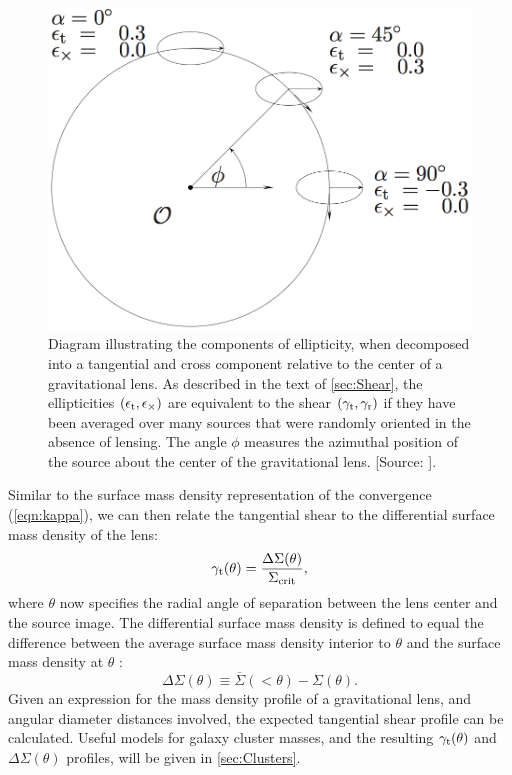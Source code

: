\begin{figure}
\begin{center}
\includegraphics[scale=0.3]{plots_intro/ShearComponents.png}
\caption[Tangential Shear]{Diagram illustrating the components of ellipticity, when decomposed into a tangential and cross component relative to the center of a gravitational lens. As described in the text of \autoref{sec:Shear}, the ellipticities $(\epsilon_{\rm t},\epsilon_{\times})$ are equivalent to the shear $(\gamma_{\rm t},\gamma_{\rm r})$ if they have been averaged over many sources that were randomly oriented in the absence of lensing. The angle $\phi$ measures the azimuthal position of the source about the center of the gravitational lens. [Source: \citet{Schneider06_WeakGravLens}].}
\label{plot:shearcomponents}
\end{center}
\end{figure}

Similar to the surface mass density representation of the convergence (\autoref{eqn:kappa}), we can then relate the tangential shear to the differential surface mass density of the lens:
\begin{equation}
\gamma_{\rm t}(\theta) = \frac{\Delta\Sigma(\theta)}{\Sigma_{\rm crit}},
\end{equation}
where $\theta$ now specifies the radial angle of separation between the lens center and the source image. The differential surface mass density is defined to equal the difference between the average surface mass density interior to $\theta$ and the surface mass density at $\theta$ \citep{Wright00}: 
\begin{equation}
\Delta\Sigma(\theta) \equiv \overline{\Sigma}(< \theta) - \Sigma(\theta).
\end{equation}
Given an expression for the mass density profile of a gravitational lens, and angular diameter distances involved, the expected tangential shear profile can be calculated. Useful models for galaxy cluster masses, and the resulting $\gamma_{\rm t}(\theta)$ and $\Delta\Sigma(\theta)$ profiles, will be given in \autoref{sec:Clusters}.

